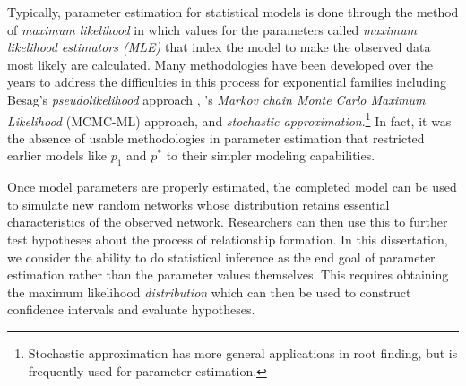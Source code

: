 Typically, parameter estimation for statistical models is done through the method of 
\emph{maximum likelihood} in which values for the parameters called \emph{maximum 
likelihood estimators (MLE)} that index the model to make the observed data most likely 
are calculated.
Many methodologies have been developed over the years to address the difficulties
in this process for exponential families
including Besag's \emph{pseudolikelihood} approach \citep{Besag:1974,Strauss:1990}, 
\citeauthor{Geyer:1992}'s \citeyearpar{Geyer:1992}
\emph{Markov chain Monte Carlo Maximum Likelihood} (MCMC-ML) approach, and 
\emph{stochastic approximation}.\footnote{Stochastic approximation has more general
applications in root finding, but is frequently used for parameter estimation.}
In fact, it was the absence of usable methodologies in parameter estimation that 
restricted earlier models like $p_1$ and $p^*$ to their simpler modeling capabilities.


Once model parameters are properly estimated, the completed model can be used to simulate 
new random networks whose distribution retains essential characteristics of 
the observed network.  Researchers can then use this 
to further test hypotheses about the process of relationship formation.  
In this dissertation, we consider the ability to do statistical inference 
as the end goal of parameter estimation rather than the parameter values 
themselves.  This requires obtaining the maximum likelihood \emph{distribution} which
can then be used to construct confidence intervals and evaluate hypotheses.



